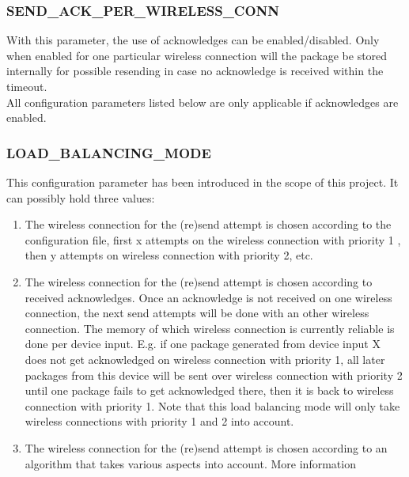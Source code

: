 \subsubsection{SEND\_ACK\_PER\_WIRELESS\_CONN}
With this parameter, the use of acknowledges can be enabled/disabled. Only when enabled for one particular wireless connection will the package be stored internally for possible resending in case no acknowledge is received within the timeout.\\
All configuration parameters listed below are only applicable if acknowledges are enabled.
%
\subsubsection{LOAD\_BALANCING\_MODE}
This configuration parameter has been introduced in the scope of this project. It can possibly hold three values:
\begin{enumerate}
    \item The wireless connection for the (re)send attempt is chosen according to the configuration file, first x attempts on the wireless connection with priority 1 , then y attempts on wireless connection with priority 2, etc.
    \item The wireless connection for the (re)send attempt is chosen according to received acknowledges. Once an acknowledge is not received on one wireless connection, the next send attempts will be done with an other wireless connection. The memory of which wireless connection is currently reliable is done per device input. E.g. if one package generated from device input X does not get acknowledged on wireless connection with priority 1, all later packages from this device will be sent over wireless connection with priority 2 until one package fails to get acknowledged there, then it is back to wireless connection with priority 1. Note that this load balancing mode will only take wireless connections with priority 1 and 2 into account.
    \item The wireless connection for the (re)send attempt is chosen according to an algorithm that takes various aspects into account. More information 
\end{enumerate}
%
